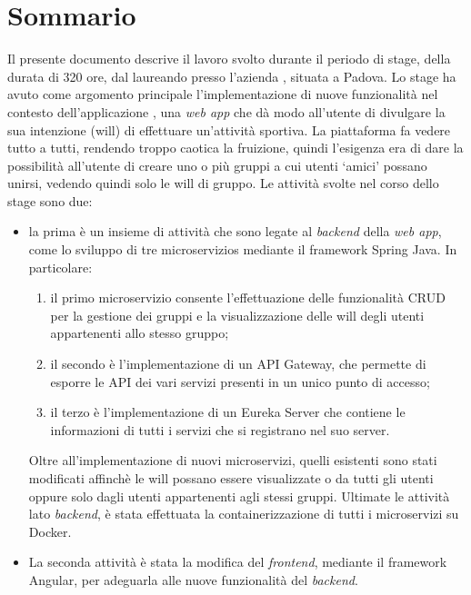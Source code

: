 
\cleardoublepage
{}
{}
\begingroup
\let\clearpage\relax
\let\cleardoublepage\relax
\let\cleardoublepage\relax

\chapter*{Sommario}

Il presente documento descrive il lavoro svolto durante il periodo di stage, della durata di 320 ore, dal laureando \myName\xspace presso
 l'azienda \myCompany, situata a Padova.
Lo stage ha avuto come argomento principale l'implementazione di nuove funzionalità nel contesto dell'applicazione \productName, una
\textit{web app} che dà modo all'utente di divulgare la sua intenzione (\gls{will}) di effettuare un'attività sportiva.
La piattaforma fa vedere tutto a tutti, rendendo troppo caotica la fruizione, quindi l'esigenza era di dare la possibilità all'utente 
di creare uno o più gruppi a cui utenti \enquote*{amici} possano unirsi, vedendo quindi solo le \gls{will} di gruppo.
Le attività svolte nel corso dello stage sono due:
\begin{itemize}
    \item la prima è un insieme di attività che sono legate al \textit{backend} della \textit{web app}, come lo sviluppo di tre \glspl{microservizio} mediante il \gls{framework} \gls{Spring} Java. 
    In particolare: 
        \begin{enumerate}
            \item il primo microservizio consente l'effettuazione delle funzionalità \gls{CRUD} per la gestione dei gruppi e la visualizzazione delle \gls{will} 
            degli utenti appartenenti allo stesso gruppo;
            \item il secondo è l'implementazione di un \gls{API Gateway}, che permette di esporre le \gls{API} dei vari servizi presenti in un 
            unico punto di accesso;
            \item il terzo è l'implementazione di un \gls{Eureka Server} che contiene le informazioni di tutti i servizi che si registrano nel suo server.
        \end{enumerate}
    Oltre all'implementazione di nuovi microservizi, quelli esistenti sono stati modificati affinchè le \gls{will} possano
    essere visualizzate o da tutti gli utenti oppure solo dagli utenti appartenenti agli stessi gruppi. 
    Ultimate le attività lato \textit{backend}, è stata effettuata la \gls{containerizzazione} di tutti i microservizi su Docker.
    \item La seconda attività è stata la modifica del \textit{frontend}, mediante il framework \gls{Angular}, per adeguarla alle nuove funzionalità del \textit{backend}.
\end{itemize}
